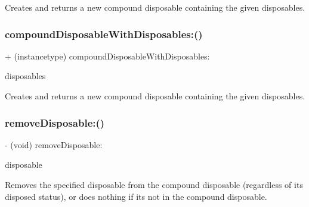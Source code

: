 Creates and returns a new compound disposable containing the given disposables. \mbox{\label{interface_r_a_c_compound_disposable_afd4c99dd46b106061bf03ba0652b3b24}} 
\subsubsection{\texorpdfstring{compound\+Disposable\+With\+Disposables\+:()}{compoundDisposableWithDisposables:()}\hspace{0.1cm}{\footnotesize\ttfamily [3/3]}}
{\footnotesize\ttfamily + (instancetype) compound\+Disposable\+With\+Disposables\+: \begin{DoxyParamCaption}\item[{(N\+S\+Array $\ast$)}]{disposables }\end{DoxyParamCaption}}

Creates and returns a new compound disposable containing the given disposables. \mbox{\label{interface_r_a_c_compound_disposable_a8aabb5a290a10d14c6ca9c966701d1b3}} 
\subsubsection{\texorpdfstring{remove\+Disposable\+:()}{removeDisposable:()}\hspace{0.1cm}{\footnotesize\ttfamily [1/3]}}
{\footnotesize\ttfamily -\/ (void) remove\+Disposable\+: \begin{DoxyParamCaption}\item[{(\mbox{\hyperlink{interface_r_a_c_disposable}{R\+A\+C\+Disposable}} $\ast$)}]{disposable }\end{DoxyParamCaption}}

Removes the specified disposable from the compound disposable (regardless of its disposed status), or does nothing if it\textquotesingle{}s not in the compound disposable.

